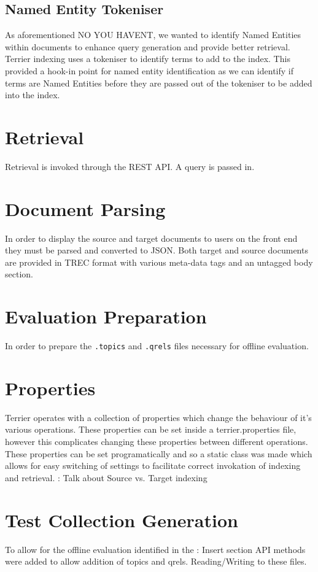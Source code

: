 \documentclass{l4proj}
\newcommand{\code}[1]{\texttt{#1}}
\begin{document}
\subsection{Named Entity Tokeniser}
As aforementioned NO YOU HAVENT, we wanted to identify Named Entities within documents to enhance query generation and provide better retrieval. Terrier indexing uses a tokeniser to identify terms to add to the index. This provided a hook-in point for named entity identification as we can identify if terms are Named Entities before they are passed out of the tokeniser to be added into the index.

\section{Retrieval}
Retrieval is invoked through the REST API. A query is passed in.

\section{Document Parsing}
In order to display the source and target documents to users on the front end they must be parsed and converted to JSON.
Both target and source documents are provided in TREC format with various meta-data tags and an untagged body section. 

\section{Evaluation Preparation}
In order to prepare the \code{.topics} and \code{.qrels} files necessary for offline evaluation. 

\section{Properties}
Terrier operates with a collection of properties which change the behaviour of it's various operations. These properties can be set inside a terrier.properties file, however this complicates changing these properties between different operations. These properties can be set programatically and so a static class was made which allows for easy switching of settings to facilitate correct invokation of indexing and retrieval. : Talk about Source vs. Target indexing

\section{Test Collection Generation}
To allow for the offline evaluation identified in the : Insert section API methods were added to allow addition of topics and qrels.
Reading/Writing to these files.
\end{document}
